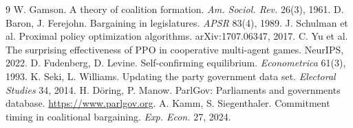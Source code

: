 \documentclass[10pt,twocolumn,a4paper]{article}
\begin{document}
\begin{thebibliography}{9}\footnotesize\setlength{\itemsep}{0pt}
 W. Gamson. A theory of coalition formation. \emph{Am. Sociol. Rev.} 26(3), 1961.
 D. Baron, J. Ferejohn. Bargaining in legislatures. \emph{APSR} 83(4), 1989.
 J. Schulman et al. Proximal policy optimization algorithms. arXiv:1707.06347, 2017.
 C. Yu et al. The surprising effectiveness of PPO in cooperative multi-agent games. NeurIPS, 2022.
 D. Fudenberg, D. Levine. Self-confirming equilibrium. \emph{Econometrica} 61(3), 1993.
 K. Seki, L. Williams. Updating the party government data set. \emph{Electoral Studies} 34, 2014.
 H. D\"oring, P. Manow. ParlGov: Parliaments and governments database. \url{https://www.parlgov.org}.
 A. Kamm, S. Siegenthaler. Commitment timing in coalitional bargaining. \emph{Exp. Econ.} 27, 2024.
\end{thebibliography}
\end{document}
